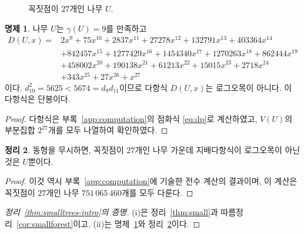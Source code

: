 \documentclass[11pt,a4paper]{article}
\theoremstyle{definition}
\newtheorem{theorem}{정리}[section]
\newtheorem{proposition}[theorem]{명제}
\begin{document}
\begin{figure}[ht]
\centering
{}
\caption{꼭짓점이 $27$개인 나무 $U$.}\label{fig:U}
\end{figure}

\begin{proposition}\label{prop:U}
나무 $U$는 $\gamma(U)=9$를 만족하고
\begin{align*}
 D(U,x)={}& 2x^{9}+75x^{10}+2837x^{11}+27278x^{12}+132791x^{13}+403364x^{14}\\
 &+842457x^{15}+1277429x^{16}+1454340x^{17}+1270263x^{18}+862444x^{19}\\
 &+458002x^{20}+190138x^{21}+61213x^{22}+15015x^{23}+2718x^{24}\\
 &+343x^{25}+27x^{26}+x^{27}
\end{align*}
이다. $d_{10}^2=5625<5674=d_{9}d_{11}$이므로 다항식 $D(U,x)$는 로그오목이 아니다.
이 다항식은 단봉이다.
\end{proposition}

\begin{proof}
다항식은 부록~\ref{app:computation}의 점화식 \eqref{eq:dp}로 계산하였고, $V(U)$의
부분집합 $2^{27}$개를 모두 나열하여 확인하였다.
\end{proof}

\begin{theorem}\label{thm:unique}
동형을 무시하면, 꼭짓점이 $27$개인 나무 가운데 지배다항식이 로그오목이 아닌 것은
$U$뿐이다.
\end{theorem}

\begin{proof}
이것 역시 부록~\ref{app:computation}에 기술한 전수 계산의 결과이며, 이 계산은 꼭짓점이
$27$개인 나무 $751\,065\,460$개를 모두 다룬다.
\end{proof}

\begin{proof}[정리~\ref{thm:smalltrees-intro}의 증명]
(i)은 정리~\ref{thm:small}과 따름정리~\ref{cor:smallforest}이고, (ii)는
명제~\ref{prop:U}와 정리~\ref{thm:unique}이다.
\end{proof}
\end{document}
